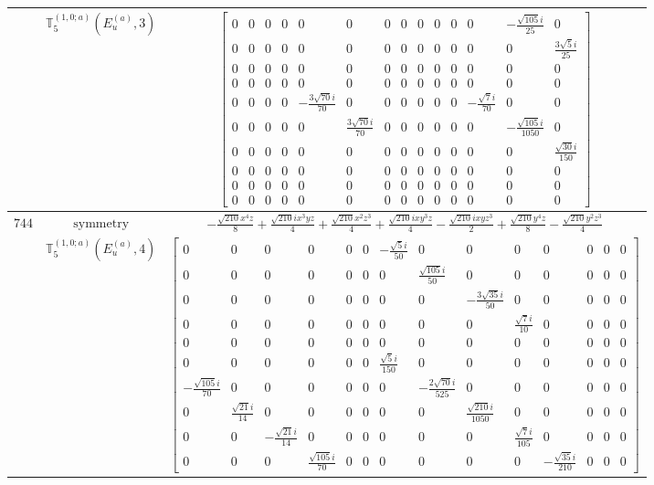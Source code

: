 \documentclass[fleqn,8pt,landscape]{jsarticle}
\begin{document}
\begin{longtable}{ccc}
$  $ & $ \mathbb{T}_{5}^{(1,0;a)}(E_{u}^{(a)},3) $ & $ \begin{bmatrix} 0 & 0 & 0 & 0 & 0 & 0 & 0 & 0 & 0 & 0 & 0 & 0 & - \frac{\sqrt{105} i}{25} & 0 \\ 0 & 0 & 0 & 0 & 0 & 0 & 0 & 0 & 0 & 0 & 0 & 0 & 0 & \frac{3 \sqrt{5} i}{25} \\ 0 & 0 & 0 & 0 & 0 & 0 & 0 & 0 & 0 & 0 & 0 & 0 & 0 & 0 \\ 0 & 0 & 0 & 0 & 0 & 0 & 0 & 0 & 0 & 0 & 0 & 0 & 0 & 0 \\ 0 & 0 & 0 & 0 & - \frac{3 \sqrt{70} i}{70} & 0 & 0 & 0 & 0 & 0 & 0 & - \frac{\sqrt{7} i}{70} & 0 & 0 \\ 0 & 0 & 0 & 0 & 0 & \frac{3 \sqrt{70} i}{70} & 0 & 0 & 0 & 0 & 0 & 0 & - \frac{\sqrt{105} i}{1050} & 0 \\ 0 & 0 & 0 & 0 & 0 & 0 & 0 & 0 & 0 & 0 & 0 & 0 & 0 & \frac{\sqrt{30} i}{150} \\ 0 & 0 & 0 & 0 & 0 & 0 & 0 & 0 & 0 & 0 & 0 & 0 & 0 & 0 \\ 0 & 0 & 0 & 0 & 0 & 0 & 0 & 0 & 0 & 0 & 0 & 0 & 0 & 0 \\ 0 & 0 & 0 & 0 & 0 & 0 & 0 & 0 & 0 & 0 & 0 & 0 & 0 & 0 \end{bmatrix} $ \\ \hline
$ 744 $ & $ \text{symmetry} $ & $ - \frac{\sqrt{210} x^{4} z}{8} + \frac{\sqrt{210} i x^{3} y z}{4} + \frac{\sqrt{210} x^{2} z^{3}}{4} + \frac{\sqrt{210} i x y^{3} z}{4} - \frac{\sqrt{210} i x y z^{3}}{2} + \frac{\sqrt{210} y^{4} z}{8} - \frac{\sqrt{210} y^{2} z^{3}}{4} $ \\
$  $ & $ \mathbb{T}_{5}^{(1,0;a)}(E_{u}^{(a)},4) $ & $ \begin{bmatrix} 0 & 0 & 0 & 0 & 0 & 0 & - \frac{\sqrt{5} i}{50} & 0 & 0 & 0 & 0 & 0 & 0 & 0 \\ 0 & 0 & 0 & 0 & 0 & 0 & 0 & \frac{\sqrt{105} i}{50} & 0 & 0 & 0 & 0 & 0 & 0 \\ 0 & 0 & 0 & 0 & 0 & 0 & 0 & 0 & - \frac{3 \sqrt{35} i}{50} & 0 & 0 & 0 & 0 & 0 \\ 0 & 0 & 0 & 0 & 0 & 0 & 0 & 0 & 0 & \frac{\sqrt{7} i}{10} & 0 & 0 & 0 & 0 \\ 0 & 0 & 0 & 0 & 0 & 0 & 0 & 0 & 0 & 0 & 0 & 0 & 0 & 0 \\ 0 & 0 & 0 & 0 & 0 & 0 & \frac{\sqrt{5} i}{150} & 0 & 0 & 0 & 0 & 0 & 0 & 0 \\ - \frac{\sqrt{105} i}{70} & 0 & 0 & 0 & 0 & 0 & 0 & - \frac{2 \sqrt{70} i}{525} & 0 & 0 & 0 & 0 & 0 & 0 \\ 0 & \frac{\sqrt{21} i}{14} & 0 & 0 & 0 & 0 & 0 & 0 & \frac{\sqrt{210} i}{1050} & 0 & 0 & 0 & 0 & 0 \\ 0 & 0 & - \frac{\sqrt{21} i}{14} & 0 & 0 & 0 & 0 & 0 & 0 & \frac{\sqrt{7} i}{105} & 0 & 0 & 0 & 0 \\ 0 & 0 & 0 & \frac{\sqrt{105} i}{70} & 0 & 0 & 0 & 0 & 0 & 0 & - \frac{\sqrt{35} i}{210} & 0 & 0 & 0 \end{bmatrix} $ \\ \hline

\end{longtable}
\end{document}

